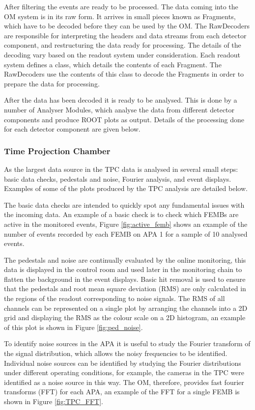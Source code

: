 After filtering the events are ready to be processed. The data coming into the
OM system is in its raw form. It arrives in small pieces known as
Fragments, which have to be decoded before they can be used by the OM. 
The RawDecoders are responsible for interpreting the headers and data streams 
from each detector component, and restructuring the data ready for processing. 
The details of the decoding vary based on the readout system under 
consideration. Each readout system defines a class, which details the 
contents of each Fragment. The RawDecoders use the contents of this class to 
decode the Fragments in order to prepare the data for 
processing.

After the data has been decoded it is ready to be analysed. This is done by a
number of Analyser Modules, which analyse the data from different detector
components and produce ROOT\cite{ANTCHEVA20092499} plots as output. Details 
of the processing done for each detector component are given below.

\subsubsection*{Time Projection Chamber}
As the largest data source in \protodune{} the TPC data is analysed in several
small steps: basic data checks, pedestals and noise, Fourier analysis, and event
displays. Examples of some of the plots produced by the TPC analysis are
detailed below.

The basic data checks are intended to quickly spot any fundamental issues with
the incoming data. An example of a basic check is to check which FEMBs are
active in the monitored events, Figure \ref{fig:active_femb} shows an example of
the number of events recorded by each FEMB on APA 1 for a sample of 10 analysed
events.

The pedestals and noise are continually evaluated by the online monitoring, this
data is displayed in the control room and used later in the monitoring chain to
flatten the background in the event displays. Basic hit removal is used to 
ensure that the pedestals and root mean square deviation (RMS) are only 
calculated in the regions of the readout corresponding to noise signals. The 
RMS of all channels can be represented on a single plot by arranging the 
channels into a 2D grid and displaying the RMS as the colour scale on a 2D 
histogram, an example of this plot is shown in Figure \ref{fig:ped_noise}.

To identify noise sources in the APA it is useful to study the Fourier transform
of the signal distribution, which allows the noisy frequencies to be identified.
Individual noise sources can be identified by studying the Fourier 
distributions under different operating conditions, for example, the cameras 
in the TPC were identified as a noise source in this way. The OM, therefore, 
provides fast fourier transforms (FFT) for each APA, an example of the FFT for 
a single FEMB is shown in Figure \ref{fig:TPC_FFT}.

